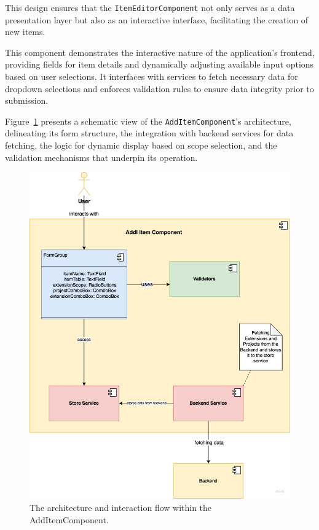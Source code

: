 This design ensures that the \texttt{ItemEditorComponent} not only serves as a data presentation layer but also as an interactive interface, facilitating the creation of new items.


This component demonstrates the interactive nature of the application's frontend, providing fields for item details and dynamically adjusting available input options based on user selections.
It interfaces with services to fetch necessary data for dropdown selections and enforces validation rules to ensure data integrity prior to submission.

Figure~\ref{fig:additem_component} presents a schematic view of the \texttt{AddItemComponent}'s architecture, delineating its form structure, the integration with backend services for data fetching, the logic for dynamic display based on scope selection, and the validation mechanisms that underpin its operation.

\begin{figure}[H]
    \centering
    \includegraphics[width=\textwidth]{./images/frontend/add-item-component}
    \caption{The architecture and interaction flow within the AddItemComponent.}
    \label{fig:additem_component}
\end{figure}

